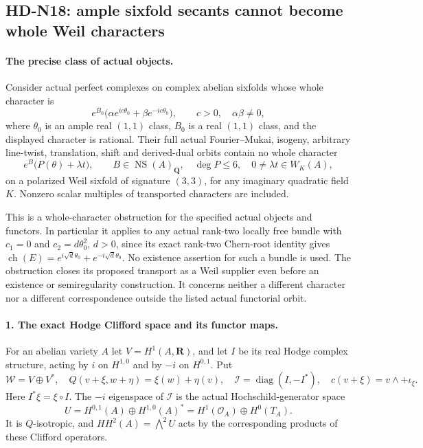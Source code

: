 \subsection{HD-N18: ample sixfold secants cannot become whole Weil characters}
\label{sec:HD-N18}

\paragraph{The precise class of actual objects.}
Consider actual perfect complexes on complex abelian sixfolds whose
whole character is
\begin{equation}
 e^{B_0}\bigl(\alpha e^{ic\theta_0}
                    +\beta e^{-ic\theta_0}\bigr),
 \qquad c>0,\quad \alpha\beta\ne0,                    \tag{N18.1}
\end{equation}
where $\theta_0$ is an ample real $(1,1)$ class, $B_0$ is a
real $(1,1)$ class, and the displayed character is rational.
Their full actual Fourier--Mukai, isogeny, arbitrary line-twist,
translation, shift and derived-dual orbits contain no whole character
\begin{equation}
 e^B\bigl(P(\theta)+\lambda t\bigr),\qquad
 B\in\operatorname{NS}(A)_{\mathbf Q},\quad
 \deg P\le6,\quad 0\ne\lambda t\in W_K(A),            \tag{N18.2}
\end{equation}
on a polarized Weil sixfold of signature $(3,3)$, for any imaginary
quadratic field $K$. Nonzero scalar multiples of transported
characters are included.

This is a whole-character obstruction for the specified actual
objects and functors. In particular it applies to any actual
rank-two locally free bundle with $c_1=0$ and
$c_2=d\theta_0^2$, $d>0$, since its exact rank-two Chern-root
identity gives $\operatorname{ch}(E)=e^{i\sqrt d\theta_0}
+e^{-i\sqrt d\theta_0}$. No existence assertion for such a bundle
is used. The obstruction closes its proposed transport as a Weil
supplier even before an existence or semiregularity construction.
It concerns neither a different character nor a different
correspondence outside the listed actual functorial orbit.

\paragraph{1. The exact Hodge Clifford space and its functor maps.}
For an abelian variety $A$ let $V=H^1(A,\mathbf R)$, and let
$I$ be its real Hodge complex structure, acting by $i$ on
$H^{1,0}$ and by $-i$ on $H^{0,1}$. Put
\begin{equation}
 \mathcal W=V\oplus V^*,\quad
 Q(v+\xi,w+\eta)=\xi(w)+\eta(v),\quad
 \mathcal I=\operatorname{diag}(I,-I^*),\quad
 c(v+\xi)=v\wedge+\iota_\xi.                         \tag{N18.3}
\end{equation}
Here $I^*\xi=\xi\circ I$. The $-i$ eigenspace of
$\mathcal I$ is the actual Hochschild-generator space
\[
 U=H^{0,1}(A)\oplus H^{1,0}(A)^*
                       =H^1(\mathcal O_A)\oplus H^0(T_A).
\]
It is $Q$-isotropic, and $HH^2(A)=\bigwedge^2U$ acts by
the corresponding products of these Clifford operators.

